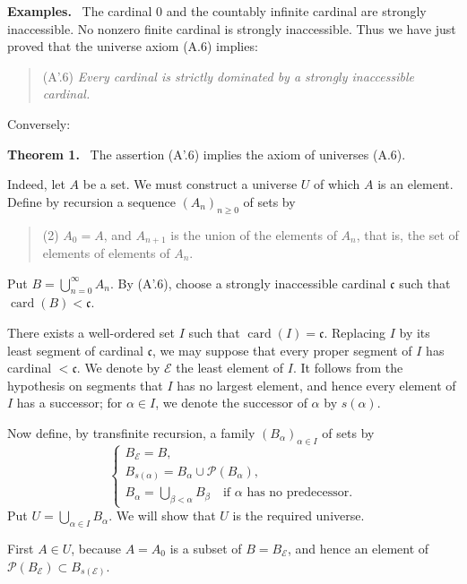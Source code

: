 \documentclass[11pt]{article}
\newcommand{\card}{\operatorname{card}}
\newcommand{\Pset}{\mathcal{P}}
\newenvironment{statement}[1]{\par\medskip\noindent\textbf{#1.}\ }{\par\medskip}
\newenvironment{remarktext}[1]{\par\medskip\noindent\textbf{#1.}\ }{\par\medskip}
\begin{document}
\begin{remarktext}{Examples}
The cardinal \(0\) and the countably infinite cardinal are strongly inaccessible. No nonzero finite cardinal is strongly inaccessible. Thus we have just proved that the universe axiom (A.6) implies:
\begin{quote}
(A'.6) \emph{Every cardinal is strictly dominated by a strongly inaccessible cardinal.}
\end{quote}
Conversely:
\end{remarktext}

\begin{statement}{Theorem 1}
The assertion (A'.6) implies the axiom of universes (A.6).
\end{statement}

Indeed, let \(A\) be a set. We must construct a universe \(U\) of which \(A\) is an element. Define by recursion a sequence \((A_n)_{n\geq0}\) of sets by
\begin{quote}
(2) \(A_0=A\), and \(A_{n+1}\) is the union of the elements of \(A_n\), that is, the set of elements of elements of \(A_n\).
\end{quote}
Put \(B=\bigcup_{n=0}^{\infty}A_n\). By (A'.6), choose a strongly inaccessible cardinal \(\mathfrak c\) such that \(\card(B)<\mathfrak c\).

There exists a well-ordered set \(I\) such that \(\card(I)=\mathfrak c\). Replacing \(I\) by its least segment of cardinal \(\mathfrak c\), we may suppose that every proper segment of \(I\) has cardinal \(<\mathfrak c\). We denote by \(\mathcal E\) the least element of \(I\). It follows from the hypothesis on segments that \(I\) has no largest element, and hence every element of \(I\) has a successor; for \(\alpha\in I\), we denote the successor of \(\alpha\) by \(s(\alpha)\).

Now define, by transfinite recursion, a family \((B_\alpha)_{\alpha\in I}\) of sets by
\begin{equation}
\begin{cases}
B_{\mathcal E}=B,\\
B_{s(\alpha)}=B_\alpha\cup\Pset(B_\alpha),\\
B_\alpha=\displaystyle\bigcup_{\beta<\alpha}B_\beta\quad\text{if \(\alpha\) has no predecessor.}
\end{cases}
\tag{3}
\end{equation}
Put \(U=\bigcup_{\alpha\in I}B_\alpha\). We will show that \(U\) is the required universe.

First \(A\in U\), because \(A=A_0\) is a subset of \(B=B_{\mathcal E}\), and hence an element of \(\Pset(B_{\mathcal E})\subset B_{s(\mathcal E)}\).
\end{document}
